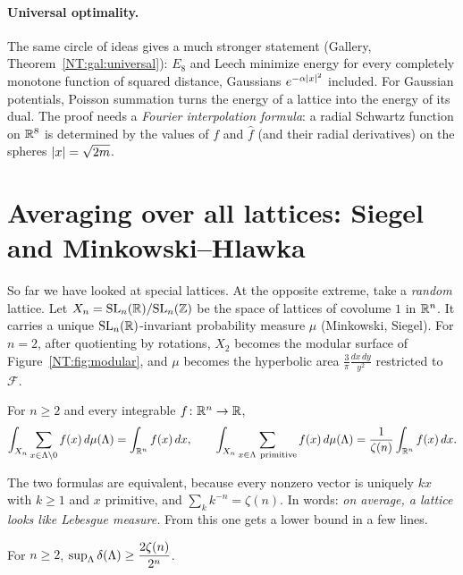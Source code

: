 \paragraph{Universal optimality.} The same circle of ideas gives a much stronger statement (Gallery,
Theorem~\ref{NT:gal:universal}): $E_8$ and Leech minimize energy for every completely monotone function of
squared distance, Gaussians $e^{-\alpha\left\lvert x \right\rvert^2}$ included. For Gaussian potentials, Poisson summation
turns the energy of a lattice into the energy of its dual. The proof needs a \emph{Fourier interpolation
formula}: a radial Schwartz function on $\mathbb{R}^8$ is determined by the values of $f$ and $\hat f$ (and
their radial derivatives) on the spheres $\left\lvert x \right\rvert=\sqrt{2m}$.

\section{Averaging over all lattices: Siegel and Minkowski--Hlawka}
\label{NT:sec:siegel}

So far we have looked at special lattices. At the opposite extreme, take a \emph{random} lattice. Let
$X_n=\mathrm{SL}_n(\mathbb{R})/\mathrm{SL}_n(\mathbb{Z})$ be the space of lattices of covolume $1$ in $\mathbb{R}^n$. It carries a unique
$\mathrm{SL}_n(\mathbb{R})$-invariant probability measure $\mu$ (Minkowski, Siegel). For $n=2$, after quotienting by
rotations, $X_2$ becomes the modular surface of Figure~\ref{NT:fig:modular}, and $\mu$ becomes the
hyperbolic area $\frac{3}{\pi}\frac{dx\,dy}{y^2}$ restricted to $\mathcal F$.

\begin{theorem}\label{NT:thm:siegel}
For $n\ge2$ and every integrable $f\colon\mathbb{R}^n\to\mathbb{R}$,
\[
  \int_{X_n}\sum_{x\in\Lat\setminus0}f(x)\,d\mu(\Lat)=\int_{\R^n}f(x)\,dx,
  \qquad
  \int_{X_n}\sum_{x\in\Lat\ \mathrm{primitive}}f(x)\,d\mu(\Lat)=\frac{1}{\zeta(n)}\int_{\R^n}f(x)\,dx .
\]
\end{theorem}

The two formulas are equivalent, because every nonzero vector is uniquely $kx$ with $k\ge1$ and $x$
primitive, and $\sum_kk^{-n}=\zeta(n)$. In words: \emph{on average, a lattice looks like Lebesgue measure.}
From this one gets a lower bound in a few lines.

\begin{corollary}\label{NT:cor:MH}
For $n\ge2$, $\sup_\Lambda\delta(\Lambda)\ge\dfrac{2\zeta(n)}{2^n}$.
\end{corollary}

